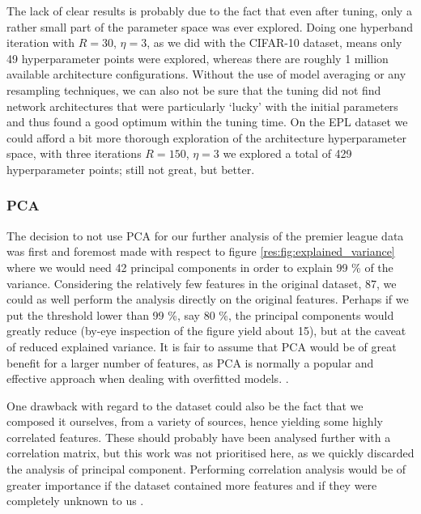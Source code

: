     The lack of clear results is probably due to the fact that even after tuning, only a rather small part of the parameter space was ever explored. Doing one hyperband iteration with $R=30$, $\eta=3$, as we did with the CIFAR-10 dataset, means only 49 hyperparameter points were explored, whereas there are roughly 1 million available architecture configurations. Without the use of model averaging or any resampling techniques, we can also not be sure that the tuning did not find network architectures that were particularly `lucky' with the initial parameters and thus found a good optimum within the tuning time. On the EPL dataset we could afford a bit more thorough exploration of the architecture hyperparameter space, with three iterations $R=150$, $\eta=3$ we explored a total of 429 hyperparameter points; still not great, but better.


\subsubsection{PCA}
    The decision to not use PCA for our further analysis of the premier league data was first and foremost made with respect to figure \ref{res:fig:explained_variance} where we would need 42 principal components in order to explain 99 \% of the variance. Considering the relatively few features in the original dataset, 87, we could as well perform the analysis directly on the original features. Perhaps if we put the threshold lower than 99 \%, say 80 \%, the principal components would greatly reduce (by-eye inspection of the figure yield about 15), but at the caveat of reduced explained variance. It is fair to assume that PCA would be of great benefit for a larger number of features, as PCA is normally a popular and effective approach when dealing with overfitted models. .

    One drawback with regard to the dataset could also be the fact that we composed it ourselves, from a variety of sources, hence yielding some highly correlated features. These should probably have been analysed further with a correlation matrix, but this work was not prioritised here, as we quickly discarded the analysis of principal component. Performing correlation analysis would be of greater importance if the dataset contained more features and  if they were completely unknown to us . 
    
